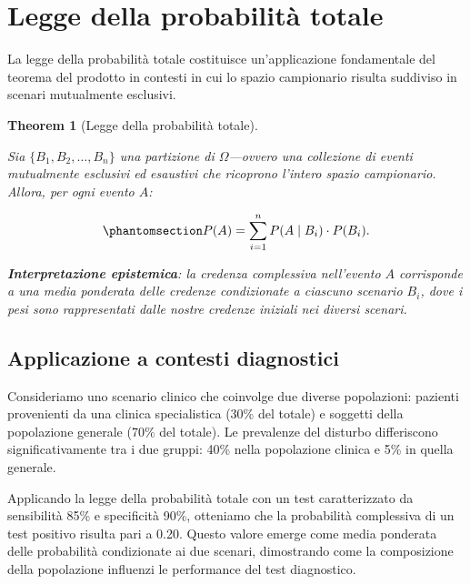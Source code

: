 \documentclass[
  letterpaper,
  DIV=11,
  numbers=noendperiod,
  oneside]{scrreprt}
\theoremstyle{definition}
\theoremstyle{plain}
\newtheorem{theorem}{Theorem}[chapter]
\theoremstyle{definition}
\theoremstyle{remark}
\begin{document}
\section{Legge della probabilità
totale}\label{legge-della-probabilituxe0-totale}

La legge della probabilità totale costituisce un'applicazione
fondamentale del teorema del prodotto in contesti in cui lo spazio
campionario risulta suddiviso in scenari mutualmente esclusivi.

\begin{theorem}[Legge della probabilità
totale]\protect\hypertarget{thm-total-probability}{}\label{thm-total-probability}

Sia \(\{B_1, B_2, \ldots, B_n\}\) una \emph{partizione} di
\(\Omega\)---ovvero una collezione di eventi mutualmente esclusivi ed
esaustivi che ricoprono l'intero spazio campionario. Allora, per ogni
evento \(A\):

\begin{equation}\phantomsection\label{eq-total-probability}{
P(A) = \sum_{i=1}^{n} P(A \mid B_i) \cdot P(B_i).
}\end{equation}

\textbf{Interpretazione epistemica}: la credenza complessiva nell'evento
\(A\) corrisponde a una media ponderata delle credenze condizionate a
ciascuno scenario \(B_i\), dove i pesi sono rappresentati dalle nostre
credenze iniziali nei diversi scenari.

\end{theorem}

\subsection{Applicazione a contesti
diagnostici}\label{applicazione-a-contesti-diagnostici}

Consideriamo uno scenario clinico che coinvolge due diverse popolazioni:
pazienti provenienti da una clinica specialistica (30\% del totale) e
soggetti della popolazione generale (70\% del totale). Le prevalenze del
disturbo differiscono significativamente tra i due gruppi: 40\% nella
popolazione clinica e 5\% in quella generale.

Applicando la legge della probabilità totale con un test caratterizzato
da sensibilità 85\% e specificità 90\%, otteniamo che la probabilità
complessiva di un test positivo risulta pari a 0.20. Questo valore
emerge come media ponderata delle probabilità condizionate ai due
scenari, dimostrando come la composizione della popolazione influenzi le
performance del test diagnostico.
\end{document}

